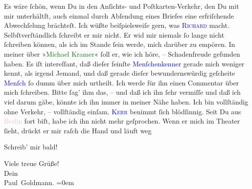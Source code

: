 \pstart
           Es wäre ſchön, wenn Du in den \strikeout{\textcolor{gray}{B}} Anſichts- und Poſtkarten-Verkehr, den Du mit mir unterhältſt, auch einmal
               durch Abſendung eines Briefes eine erfriſchende Abwechſelung brächteſt. Ich wüßte
               beiſpielsweiſe gern, was \textsc{\textcolor{blue}{Richard}{}\ledrightnote{\textcolor{blue}{Richard Beer-Hofmann}}} macht. Selbſtverſtändlich ſchreibt er mir nicht. Er wid mir niemals ſo lange
               nicht ſchreiben können, als {\pb}ich im
               Stande ſein werde, mich darüber zu empören. In meiner \label{K_L03055-4v}\label{K_L03055-4h} über »\textcolor{green}{Michael Kramer}{}\ledrightnote{\textcolor{green}{Michael Kramer. Drama}}« ſoll er, wie ich höre, –
               Schadenfreude gefunden haben. Es iſt intereſſant, daß dieſer feinſte \strikeout{\textcolor{gray}{×}\-\textcolor{gray}{×}\-\textcolor{gray}{×}\-\textcolor{gray}{×}\-\textcolor{gray}{×}}\textcolor{blue}{Menſchenkenner}{}\ledrightnote{{$\rightarrow$}\textcolor{blue}{Richard Beer-Hofmann}} gerade mich
               weniger kennt, als irgend Jemand, und daß gerade dieſer bewundernswürdig geſcheite
                  \textcolor{blue}{Menſch}{}\ledrightnote{{$\rightarrow$}\textcolor{blue}{Richard Beer-Hofmann}} ſo dumm über mich
               urtheilt. Ich werde für ihn einen Commentar über mich ſchreiben. Bitte ſag’ ihm das,
               – und daß ich ihn ſehr vermiſſe und daß ich viel darum gäbe, könnte ich ihn immer in
               meiner Nähe haben. {\pb}Ich bin vollſtändig
               ohne Verkehr, – vollſtändig einſam. \textsc{\textcolor{blue}{Kerr}{}\ledrightnote{\textcolor{blue}{Alfred Kerr}}} benimmt ſich blödſinnig. Seit Du aus \textcolor{pink}{Berlin}{}\ledrightnote{\textcolor{pink}{Berlin}}
               fort biſt, habe ich ihn nicht mehr geſprochen. Wenn er mich im Theater ſieht, drückt
               er mir raſch die Hand und läuft weg{\dotssix}\pend
           
\pstart
           Schreib’ mir bald!\pend
           
\pstart
           Viele treue Grüße! {\\[\baselineskip]}Dein {\\[\baselineskip]}\spacefill\mbox{Paul Goldmann.}\pend
           \leftskip=0em{}\endnumbering{}
\begin{anhang}
\end{anhang}
      